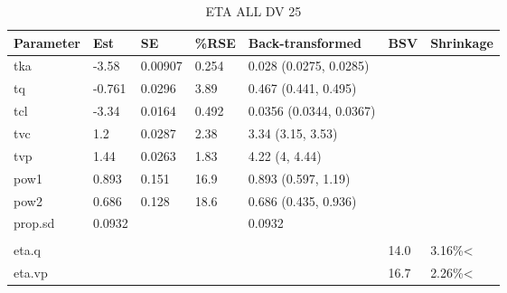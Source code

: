 \begin{table}
\centering\centering
\caption{ETA ALL DV 25}
\centering
\fontsize{8}{10}\selectfont
\begin{tabular}[t]{lllllll}
\toprule
\textbf{Parameter} & \textbf{Est} & \textbf{SE} & \textbf{\%RSE} & \textbf{Back-transformed} & \textbf{BSV} & \textbf{Shrinkage}\\
\midrule
tka & -3.58 & 0.00907 & 0.254 & 0.028 (0.0275, 0.0285) &  & \\
\midrule
tq & -0.761 & 0.0296 & 3.89 & 0.467 (0.441, 0.495) &  & \\
\midrule
tcl & -3.34 & 0.0164 & 0.492 & 0.0356 (0.0344, 0.0367) &  & \\
\midrule
tvc & 1.2 & 0.0287 & 2.38 & 3.34 (3.15, 3.53) &  & \\
\midrule
tvp & 1.44 & 0.0263 & 1.83 & 4.22 (4, 4.44) &  & \\
\midrule
pow1 & 0.893 & 0.151 & 16.9 & 0.893 (0.597, 1.19) &  & \\
\midrule
pow2 & 0.686 & 0.128 & 18.6 & 0.686 (0.435, 0.936) &  & \\
\midrule
prop.sd & 0.0932 &  &  & 0.0932 &  & \\
\midrule\\
eta.q &  &  &  &  & 14.0 & 3.16\%<\\
\midrule
eta.vp &  &  &  &  & 16.7 & 2.26\%<\\
\bottomrule
\end{tabular}
\end{table}